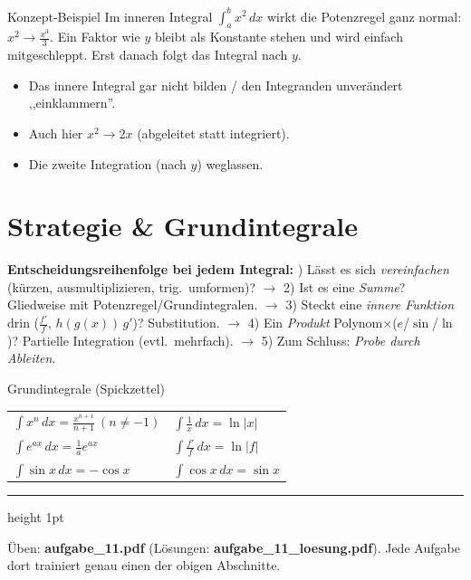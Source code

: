 \documentclass[a4paper,11pt]{article}
\begin{document}
\begin{bspbox}{Konzept-Beispiel}
Im inneren Integral $\int_a^b x^2\,dx$ wirkt die Potenzregel ganz normal: $x^2\to\frac{x^3}{3}$.
Ein Faktor wie $y$ bleibt als Konstante stehen und wird einfach mitgeschleppt. Erst danach folgt
das Integral nach $y$.
\end{bspbox}

\begin{fehlerbox}
\begin{itemize}[leftmargin=1.4em,itemsep=2pt]
  \item Das innere Integral gar nicht bilden / den Integranden unverändert ,,einklammern''.
  \item Auch hier $x^2\to2x$ (abgeleitet statt integriert).
  \item Die zweite Integration (nach $y$) weglassen.
\end{itemize}
\end{fehlerbox}

\section{Strategie \& Grundintegrale}

\begin{merkbox}
\textbf{Entscheidungsreihenfolge bei jedem Integral:}
) Lässt es sich \emph{vereinfachen} (kürzen, ausmultiplizieren, trig.\ umformen)?
\;$\to$ 2) Ist es eine \emph{Summe}? Gliedweise mit Potenzregel/Grundintegralen.
\;$\to$ 3) Steckt eine \emph{innere Funktion} drin ($\frac{f'}{f}$, $h(g(x))\,g'$)? Substitution.
\;$\to$ 4) Ein \emph{Produkt} Polynom$\times$($e$/$\sin$/$\ln$)? Partielle Integration (evtl.\ mehrfach).
\;$\to$ 5) Zum Schluss: \emph{Probe durch Ableiten}.
\end{merkbox}

\begin{satzbox}{Grundintegrale (Spickzettel)}
\renewcommand{\arraystretch}{1.6}
\begin{tabular}{@{}p{6.2cm}p{6.2cm}@{}}
$\displaystyle\int x^{n}\,dx=\frac{x^{n+1}}{n+1}\ (n\neq-1)$ &
$\displaystyle\int \frac{1}{x}\,dx=\ln|x|$ \\
$\displaystyle\int e^{ax}\,dx=\frac{1}{a}e^{ax}$ &
$\displaystyle\int \frac{f'}{f}\,dx=\ln|f|$ \\
$\displaystyle\int \sin x\,dx=-\cos x$ &
$\displaystyle\int \cos x\,dx=\sin x$ \\
\end{tabular}
\end{satzbox}

\vfill
{\color{gridcol}\hrule height 1pt}
\vspace{0.3em}
{\color{gridcol}\small Üben: \textbf{aufgabe\_11.pdf} (Lösungen: \textbf{aufgabe\_11\_loesung.pdf}).
Jede Aufgabe dort trainiert genau einen der obigen Abschnitte.}
\end{document}
